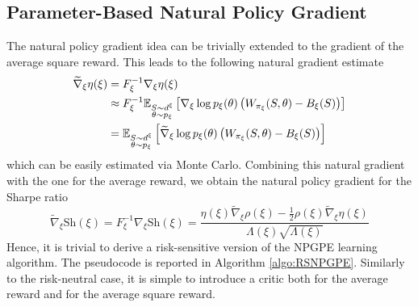\subsection{Parameter-Based Natural Policy Gradient}
The natural policy gradient idea can be trivially extended to the gradient of the average square reward. This leads to the following natural gradient estimate 
\begin{equation}
	\begin{split}
	\widetilde{\nabla}_\xi \eta(\xi) &=  F_\xi^{-1} \nabla_\xi \eta(\xi)\\
									 &\approx  F_\xi^{-1} \E[\substack{S \sim d^\xi\\\theta \sim p_\xi}]{\nabla_\xi \log p_\xi(\theta) \left(W_{\pi_\xi}(S, \theta) - B_\xi(S)\right)}\\
									 &=\E[\substack{S \sim d^\xi\\\theta \sim p_\xi}]{\widetilde{\nabla}_\xi \log p_\xi(\theta) \left(W_{\pi_\xi}(S, \theta) - B_\xi(S)\right)}
	\end{split}
\end{equation}
which can be easily estimated via Monte Carlo. Combining this natural gradient with the one for the average reward, we obtain the natural policy gradient for the Sharpe ratio
\begin{equation}
	\widetilde{\nabla}_\xi \text{Sh}(\xi) = F_\xi^{-1} \nabla_\xi \text{Sh}(\xi) = \frac{\eta(\xi) \widetilde{\nabla}_\xi \rho(\xi) - \frac{1}{2} \rho(\xi) \widetilde{\nabla}_\xi \eta(\xi)}{\Lambda(\xi) \sqrt{\Lambda(\xi)}}
\end{equation}
Hence, it is trivial to derive a risk-sensitive version of the NPGPE learning algorithm. The pseudocode is reported in Algorithm \ref{algo:RSNPGPE}. Similarly to the risk-neutral case, it is simple to introduce a critic both for the average reward and for the average square reward. 

